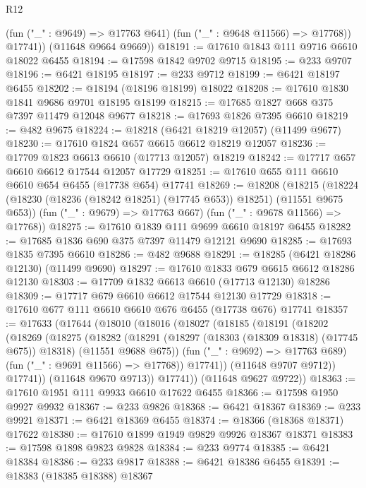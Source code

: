 \begin{lexlean}{R12}
\begin{coremodule}
{{{{{{{{{{{{{{{{{{{{{{{{{{{{{{{{{{{{{{{{{{{{{{{{{{{{{{{{{{{{{{{{{{{{{{{{{{{{{{{{{{            (fun ("_" : @9649) => @17763 @641)
            (fun ("_" : @9648 @11566) => @17768))
          @17741))
      (@11648 @9664 @9669))
@18191 := @17610 @1843 @111 @9716 @6610 @18022 @6455
@18194 := @17598 @1842 @9702 @9715
@18195 := @233 @9707
@18196 := @6421 @18195
@18197 := @233 @9712
@18199 := @6421 @18197 @6455
@18202 := @18194 (@18196 @18199) @18022
@18208 := @17610 @1830 @1841 @9686 @9701 @18195 @18199
@18215 := @17685 @1827 @668 @375 @7397 @11479 @12048 @9677
@18218 := @17693 @1826 @7395 @6610
@18219 := @482 @9675
@18224 := @18218 (@6421 @18219 @12057) (@11499 @9677)
@18230 := @17610 @1824 @657 @6615 @6612 @18219 @12057
@18236 := @17709 @1823 @6613 @6610 (@17713 @12057) @18219
@18242 := @17717 @657 @6610 @6612 @17544 @12057 @17729
@18251 := @17610 @655 @111 @6610 @6610 @654 @6455 (@17738 @654) @17741
@18269 := @18208
    (@18215
      (@18224 (@18230 (@18236 (@18242 @18251) (@17745 @653)) @18251) (@11551 @9675 @653))
      (fun ("_" : @9679) => @17763 @667)
      (fun ("_" : @9678 @11566) => @17768))
@18275 := @17610 @1839 @111 @9699 @6610 @18197 @6455
@18282 := @17685 @1836 @690 @375 @7397 @11479 @12121 @9690
@18285 := @17693 @1835 @7395 @6610
@18286 := @482 @9688
@18291 := @18285 (@6421 @18286 @12130) (@11499 @9690)
@18297 := @17610 @1833 @679 @6615 @6612 @18286 @12130
@18303 := @17709 @1832 @6613 @6610 (@17713 @12130) @18286
@18309 := @17717 @679 @6610 @6612 @17544 @12130 @17729
@18318 := @17610 @677 @111 @6610 @6610 @676 @6455 (@17738 @676) @17741
@18357 := @17633
    (@17644
      (@18010
        (@18016
          (@18027
            (@18185
              (@18191
                (@18202
                  (@18269
                    (@18275
                      (@18282
                        (@18291
                          (@18297 (@18303 (@18309 @18318) (@17745 @675)) @18318)
                          (@11551 @9688 @675))
                        (fun ("_" : @9692) => @17763 @689)
                        (fun ("_" : @9691 @11566) => @17768))
                      @17741))
                  (@11648 @9707 @9712))
                @17741))
            (@11648 @9670 @9713))
          @17741))
      (@11648 @9627 @9722))
@18363 := @17610 @1951 @111 @9933 @6610 @17622 @6455
@18366 := @17598 @1950 @9927 @9932
@18367 := @233 @9826
@18368 := @6421 @18367
@18369 := @233 @9921
@18371 := @6421 @18369 @6455
@18374 := @18366 (@18368 @18371) @17622
@18380 := @17610 @1899 @1949 @9829 @9926 @18367 @18371
@18383 := @17598 @1898 @9823 @9828
@18384 := @233 @9774
@18385 := @6421 @18384
@18386 := @233 @9817
@18388 := @6421 @18386 @6455
@18391 := @18383 (@18385 @18388) @18367
}}}}}}}}}}}}}}}}}}}}}}}}}}}}}}}}}}}}}}}}}}}}}}}}}}}}}}}}}}}}}}}}}}}}}}}}}}}}}}}}}}
\end{coremodule}
\end{lexlean}
